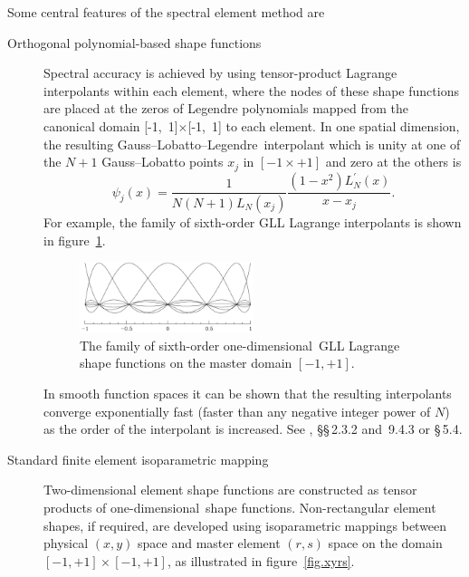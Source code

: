 \documentclass[11pt]{report}
\newcommand\oned{one-di\-men\-sion\-al}
\newcommand\GLL{Gauss--Lobatto--Legendre}
\begin{document}
Some central features of the spectral element method are
\begin{description}
\item[Orthogonal polynomial-based shape functions] Spectral accuracy
  is achieved by using tensor-product Lagrange interpolants within
  each element, where the nodes of these shape functions are placed at
  the zeros of Legendre polynomials mapped from the canonical domain
  [-1,~1]$\times$[-1,~1] to each element.  In one spatial dimension,
  the resulting \GLL\ interpolant which is unity at one of the $N + 1$
  Gauss--Lobatto points $x_j$ in $[-1\times+1]$ and zero at the others
  is
\begin{equation}
\psi_j(x) = \frac{1}{N(N+1)L_N(x_j)}\frac{(1-x^2)L_N^\prime(x)}{x - x_j}.
\end{equation}
For example, the family of sixth-order GLL Lagrange interpolants is
shown in figure~\ref{fig:shapes}.
\begin{figure}
\begin{center}
  \includegraphics[width=0.5\textwidth]{shape7x7}
\end{center}
\caption{The family of sixth-order \oned\ GLL Lagrange shape functions
  on the master domain $[-1,+1]$.}
\label{fig:shapes}
\end{figure}
In smooth function spaces it can be shown that the resulting
interpolants converge exponentially fast (faster than any negative
integer power of $N$) as the order of the interpolant is increased.
See \citet{chqz88}, \S\S\,2.3.2 and~9.4.3 or \citet{chqz06} \S\,5.4.
\item[Standard finite element isoparametric mapping] Two-dimensional
  element shape functions are constructed as tensor products of
  \oned\ shape functions.  Non-rectangular element shapes, if
  required, are developed using isoparametric mappings between
  physical $(x,y)$ space and master element $(r,s)$ space on the domain
  $[-1,+1]\times[-1,+1]$, as illustrated in figure~\ref{fig.xyrs}.
\begin{figure}
\begin{center}

\end{center}
\end{figure}
\end{description}
\end{document}
